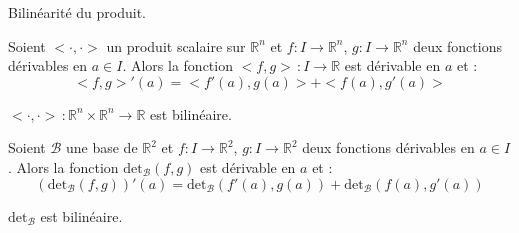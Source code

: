 \documentclass[french,11pt,twoside]{VcCours}
\begin{document}
\begin{Demonstration}{} Bilinéarité du produit.
\end{Demonstration}

\begin{Corollaire}{} Soient $< \cdot , \cdot>$ un produit scalaire sur $\mathbb{R}^n$ et $f: I \rightarrow \mathbb{R}^n$, $g : I \rightarrow \mathbb{R}^n$ deux fonctions dérivables en $a \in I$. Alors la fonction $<f,g> \, :  I \rightarrow \mathbb{R}$ est dérivable en $a$ et :
$$ <f,g>'(a) = <f'(a),g(a)>+<f(a),g'(a)>$$
\end{Corollaire}

\begin{Demonstration}{} $< \cdot , \cdot> \, : \mathbb{R}^n \times \mathbb{R}^n \rightarrow \mathbb{R}$ est bilinéaire.
\end{Demonstration}
%


\begin{Corollaire}{} Soient $\mathcal{B}$ une base de  $\mathbb{R}^2$ et $f: I \rightarrow \mathbb{R}^2$, $g : I \rightarrow \mathbb{R}^2$ deux fonctions dérivables en $a \in I$. Alors la fonction $\textrm{det}_{\mathcal{B}}(f,g)$ est dérivable en $a$ et :
$$ (\textrm{det}_{\mathcal{B}}(f,g))'(a) = \textrm{det}_{\mathcal{B}}(f'(a),g(a)) + \textrm{det}_{\mathcal{B}}(f(a),g'(a))$$
\end{Corollaire}

\begin{Demonstration}{} $\textrm{det}_{\mathcal{B}}$ est bilinéaire.
\end{Demonstration}
\end{document}
